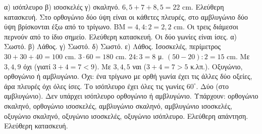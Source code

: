  α) ισόπλευρο β) ισοσκελές γ) σκαληνό.
 $6{,}5+7+8{,}5=22$ cm.
 Ελεύθερη κατασκευή. Στο ορθογώνιο δύο ύψη είναι οι κάθετες πλευρές, στο αμβλυγώνιο δύο ύψη βρίσκονται έξω από το τρίγωνο.
 $\mathrm{ΒΜ}=4{,}4:2=2{,}2$ cm.
 Οι τρεις διάμεσοι περνούν από το ίδιο σημείο.
 Ελεύθερη κατασκευή. Οι δύο γωνίες είναι ίσες.
 α) Σωστό. β) Λάθος. γ) Σωστό. δ) Σωστό. ε) Λάθος.
 Ισοσκελές, περίμετρος $30+30+40=100$ cm.
 $3\cdot60=180$ cm.
 $24:3=8$ μ.
 $(50-20):2=15$ cm.
 Με $3,4,9$ όχι (γιατί $3+4=7<9$). Με $3,4,5$ ναι ($3+4=7>5$ κ.λπ.).
 Οξυγώνιο, ορθογώνιο ή αμβλυγώνιο.
 Όχι: ένα τρίγωνο με ορθή γωνία έχει τις άλλες δύο οξείες, άρα πλευρές όχι όλες ίσες. Το ισόπλευρο έχει όλες τις γωνίες $60^\circ$.
 Δύο (στο αμβλυγώνιο).
 Δεν υπάρχει ισόπλευρο ορθογώνιο ή αμβλυγώνιο. Υπάρχουν: ορθογώνιο σκαληνό, ορθογώνιο ισοσκελές, αμβλυγώνιο σκαληνό, αμβλυγώνιο ισοσκελές, οξυγώνιο σκαληνό, οξυγώνιο ισοσκελές, οξυγώνιο ισόπλευρο.
 Ελεύθερη απάντηση.
 Ελεύθερη κατασκευή.
